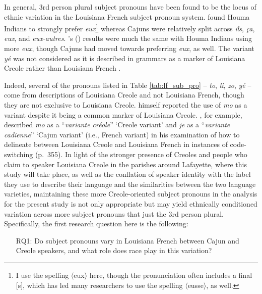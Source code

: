 \documentclass{article}\usepackage[]{graphicx}\usepackage[]{xcolor}
\newcommand{\orth}[1]{$\langle$#1$\rangle$}
\newcommand{\lexi}[1]{\textit{#1}}
\newcommand{\gloss}[1]{`#1'}
\newcommand{\foreign}[1]{\textit{#1}}
\begin{document}
      In general, 3rd person plural subject pronouns have been found to be the locus of ethnic variation in the Louisiana French subject pronoun system.
      \textcite{rottet_language_1995} found Houma Indians to strongly prefer \lexi{eux}\footnote{
        I use the spelling \orth{eux} here, though the pronunciation often includes a final [s], which has led many researchers to use the spelling \orth{eusse}, as well.
      } whereas Cajuns were relatively split across \lexi{ils}, \lexi{ça}, \lexi{eux}, and \lexi{eux-autres}.
      \citeauthor{dajko_ethnic_2009}'s (\citeyear{dajko_ethnic_2009}) results were much the same with Houma Indians using more \lexi{eux}, though Cajuns had moved towards preferring \lexi{eux}, as well.
      The variant \lexi{yé} was not considered as it is described in grammars as a marker of Louisiana Creole rather than Louisiana French \parencite{klingler_if_2003, neumann_creole_1985}.

      Indeed, several of the pronouns listed in Table \ref{tab:lf_sub_pro} -- \lexi{to}, \lexi{li}, \lexi{zo}, \lexi{yé} -- come from descriptions of Louisiana Creole and not Louisiana French, though they are not exclusive to Louisiana Creole.
      \textcite{rottet_language_1995} himself reported the use of \lexi{mo} as a variant despite it being a common marker of Louisiana Creole.
      \textcite{klingler_probleme_2005}, for example, described \lexi{mo} as a ``\foreign{variante créole}'' \gloss{Creole variant} and \lexi{je} as a ``\foreign{variante cadienne}'' \gloss{Cajun variant} (i.e., French variant) in his examination of how to delineate between Louisiana Creole and Louisiana French in instances of code-switching (p.~355).
      In light of the stronger presence of Creoles and people who claim to speaker Louisiana Creole in the parishes around Lafayette, where this study will take place, as well as the conflation of speaker identity with the label they use to describe their language and the similarities between the two language varieties, maintaining these more Creole-oriented subject pronouns in the analysis for the present study is not only appropriate but may yield ethnically conditioned variation across more subject pronouns that just the 3rd person plural.
      Specifically, the first research question here is the following:
      \begin{itemize}
        \item[RQ1:] Do subject pronouns vary in Louisiana French between Cajun and Creole speakers, and what role does race play in this variation?
      \end{itemize}
\end{document}

